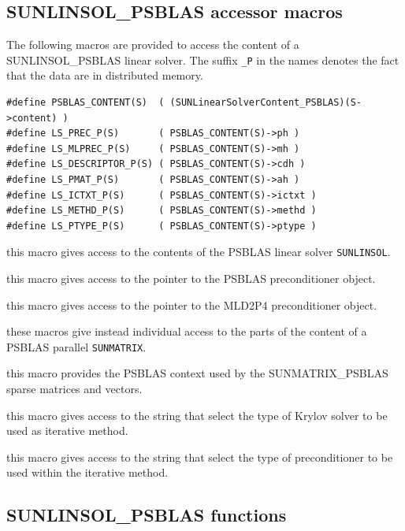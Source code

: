 \documentclass[twoside,a4paper]{refart}
\theoremstyle{definition}
\begin{document}
\subsection{SUNLINSOL\_PSBLAS accessor macros}

The following macros are provided to access the content of a SUNLINSOL\_PSBLAS linear solver. The suffix \texttt{\_P} in the names denotes the fact that the data are in distributed memory.

\begin{lstlisting}[style=CStyle]
#define PSBLAS_CONTENT(S)  ( (SUNLinearSolverContent_PSBLAS)(S->content) )
#define LS_PREC_P(S)       ( PSBLAS_CONTENT(S)->ph )
#define LS_MLPREC_P(S)     ( PSBLAS_CONTENT(S)->mh )
#define LS_DESCRIPTOR_P(S) ( PSBLAS_CONTENT(S)->cdh )
#define LS_PMAT_P(S)       ( PSBLAS_CONTENT(S)->ah )
#define LS_ICTXT_P(S)      ( PSBLAS_CONTENT(S)->ictxt )
#define LS_METHD_P(S)      ( PSBLAS_CONTENT(S)->methd )
#define LS_PTYPE_P(S)      ( PSBLAS_CONTENT(S)->ptype )
\end{lstlisting}

 this macro gives access to the contents of the PSBLAS linear solver \texttt{SUNLINSOL}.
	
 this macro gives access to the pointer to the PSBLAS preconditioner object.

 this macro gives access to the pointer to the MLD2P4 preconditioner object.

 these macros give instead individual access to the parts of the content of a PSBLAS parallel \texttt{SUNMATRIX}.

 this macro provides the PSBLAS context used by the SUNMATRIX\_PSBLAS sparse matrices and vectors.

 this macro gives access to the string that select the type of Krylov solver to be used as iterative method.

 this macro gives access to the string that select the type of preconditioner to be used within the iterative method.

\subsection{SUNLINSOL\_PSBLAS functions}
\end{document}
